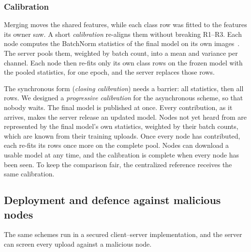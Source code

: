 \documentclass[pdflatex,sn-mathphys-num]{sn-jnl}
\begin{document}
\subsubsection{Calibration}\label{sec:calib}
Merging moves the shared features, while each class row was fitted to the features its owner saw. A short \emph{calibration} re-aligns them without breaking R1--R3. Each node computes the BatchNorm statistics of the final model on its own images~\cite{ioffe2015bn}. The server pools them, weighted by batch count, into a mean and variance per channel. Each node then re-fits only its own class rows on the frozen model with the pooled statistics, for one epoch, and the server replaces those rows.

The synchronous form (\emph{closing calibration}) needs a barrier: all statistics, then all rows. We designed a \emph{progressive calibration} for the asynchronous scheme, so that nobody waits. The final model is published at once. Every contribution, as it arrives, makes the server release an updated model. Nodes not yet heard from are represented by the final model's own statistics, weighted by their batch counts, which are known from their training uploads. Once every node has contributed, each re-fits its rows once more on the complete pool. Nodes can download a usable model at any time, and the calibration is complete when every node has been seen. To keep the comparison fair, the centralized reference receives the same calibration.

\subsection{Deployment and defence against malicious nodes}\label{sec:deploy}
The same schemes run in a secured client--server implementation, and the server can screen every upload against a malicious node.
\end{document}
